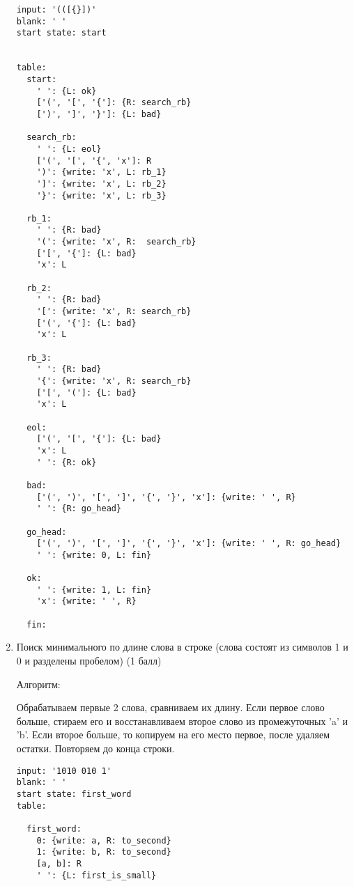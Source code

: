 \documentclass{article}
\begin{document}
\begin{enumerate}
        \begin{verbatim}
input: '(([{}])'
blank: ' '
start state: start


table:
  start:
    ' ': {L: ok}    
    ['(', '[', '{']: {R: search_rb}
    [')', ']', '}']: {L: bad}
    
  search_rb:
    ' ': {L: eol}    
    ['(', '[', '{', 'x']: R
    ')': {write: 'x', L: rb_1}
    ']': {write: 'x', L: rb_2}
    '}': {write: 'x', L: rb_3}
  
  rb_1:
    ' ': {R: bad}
    '(': {write: 'x', R:  search_rb}
    ['[', '{']: {L: bad}
    'x': L
  
  rb_2:
    ' ': {R: bad}
    '[': {write: 'x', R: search_rb}
    ['(', '{']: {L: bad}
    'x': L

  rb_3:
    ' ': {R: bad}
    '{': {write: 'x', R: search_rb}
    ['[', '(']: {L: bad}
    'x': L 
    
  eol:
    ['(', '[', '{']: {L: bad} 
    'x': L
    ' ': {R: ok}
    
  bad:
    ['(', ')', '[', ']', '{', '}', 'x']: {write: ' ', R}
    ' ': {R: go_head}
  
  go_head:
    ['(', ')', '[', ']', '{', '}', 'x']: {write: ' ', R: go_head}
    ' ': {write: 0, L: fin}
    
  ok:
    ' ': {write: 1, L: fin}
    'x': {write: ' ', R}

  fin:

        \end{verbatim}


   
    \item Поиск минимального по длине слова в строке (слова состоят из символов 1 и 0 и разделены пробелом) (1 балл)
    
        Алгоритм:
        \begin{enumerate}
            Обрабатываем первые 2 слова, сравниваем их длину. Если первое слово больше, стираем его и восстанавливаем второе слово из промежуточных 'a' и 'b'. Если второе больше, то копируем на его место первое, после удаляем остатки. Повторяем до конца строки.
        \end{enumerate}
        
        \begin{verbatim}
input: '1010 010 1'
blank: ' '
start state: first_word
table:
  
  first_word:
    0: {write: a, R: to_second}
    1: {write: b, R: to_second}
    [a, b]: R
    ' ': {L: first_is_small}
  

\end{verbatim}
\end{enumerate}
\end{document}
